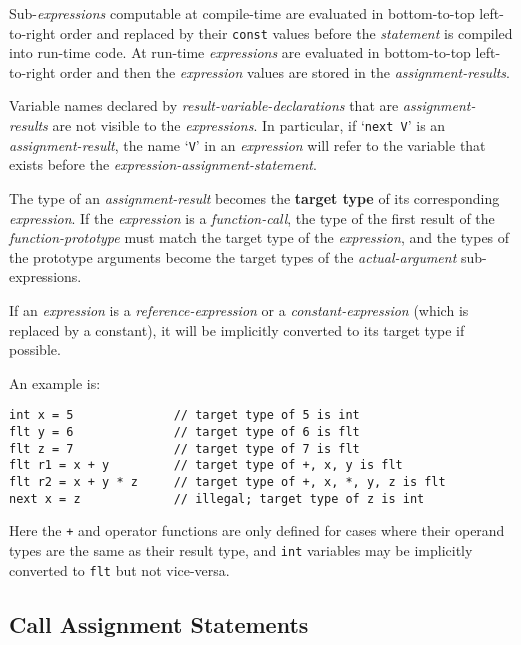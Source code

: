 \documentclass[12pt]{article}
\newcommand{\key}[1]{{\rm \bfseries #1}}
\newenvironment{indpar}[1][0.3in]%
	{\begin{list}{}%
		     {\setlength{\itemsep}{0in}%
		      \setlength{\topsep}{0in}%
		      \setlength{\parsep}{1ex}%
		      \setlength{\labelwidth}{#1}%
		      \setlength{\leftmargin}{#1}%
		      \addtolength{\leftmargin}{\labelsep}}%
	 \item}%
	{\end{list}}
\begin{document}
Sub-{\em expressions} computable at compile-time are evaluated
in bottom-to-top left-to-right order and replaced by their {\tt const} values
before the {\em statement} is compiled into run-time code.
At run-time {\em expressions} are evaluated in bottom-to-top
left-to-right order and
then the {\em expression} values are stored in the {\em assignment-results}.

Variable names declared by {\em result-variable-declarations} that are
{\em assignment-results} are not visible to the {\em expressions}.
In particular, if `{\tt next V}' is an {\em assignment-result},
the name `{\tt V}' in an {\em expression} will refer to the variable
that exists before the {\em expression-assignment-statement}.

The type of an {\em assignment-result} becomes the \key{target type}
of its corresponding {\em expression}.  If the {\em expression}
is a {\em function-call}, the type of the first result of the
{\em function-prototype} must match the target type of the {\em expression},
and the types of the prototype arguments become the target types
of the {\em actual-argument} sub-expressions.

If an {\em expression} is a {\em reference-expression}
or a {\em constant-expression}
(which is replaced by a constant),
it will be implicitly
converted to its target type if possible.

An example is:
\begin{indpar}\begin{verbatim}
int x = 5              // target type of 5 is int
flt y = 6              // target type of 6 is flt
flt z = 7              // target type of 7 is flt
flt r1 = x + y         // target type of +, x, y is flt
flt r2 = x + y * z     // target type of +, x, *, y, z is flt
next x = z             // illegal; target type of z is int
\end{verbatim}\end{indpar}

Here the {\tt +} and {\tt *} operator functions are only defined
for cases where their operand types are the same as their result type,
and {\tt int} variables may be implicitly converted to {\tt flt}
but not vice-versa.

\subsection{Call Assignment Statements}
\label{CALL-ASSIGNMENT-STATEMENTS}
\end{document}
